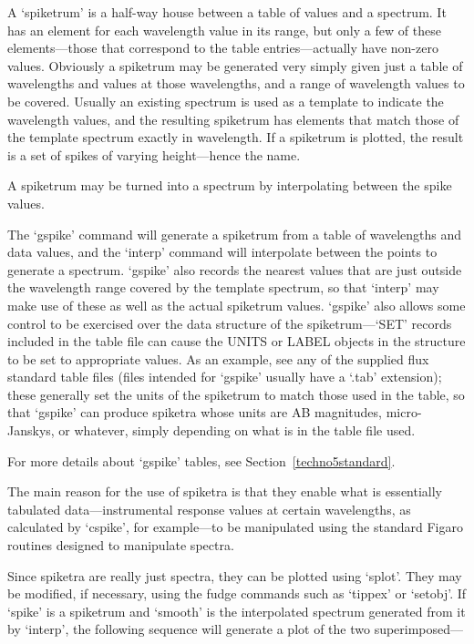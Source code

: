 \documentclass[11pt,twoside]{article}
\newcommand{\htmlref}[2]{#1}
\newcommand{\latorhtm}[2]{#1}
\newcommand{\latorhtm}[2]{#2}
\begin{document}
   A `spiketrum' is a half-way house between a table of values and a
   spectrum.  It has an element for each wavelength value in its range,
   but only a few of these elements\latorhtm{---}{-}those that correspond to
   the table entries\latorhtm{---}{-}actually have non-zero values.
   Obviously a spiketrum may
   be generated very simply given just a table of wavelengths and values
   at those wavelengths, and a range of wavelength values to be covered.
   Usually an existing spectrum is used as a template to indicate the
   wavelength values, and the resulting spiketrum has elements that
   match those of the template spectrum exactly in wavelength.  If a
   spiketrum is plotted, the result is a set of spikes of varying
   height\latorhtm{---}{-}hence the name.

   A spiketrum may be turned into a spectrum by interpolating between
   the spike values.

   The `gspike' command will generate a spiketrum from a table of
   wavelengths and data values, and the `interp' command will
   interpolate between the points to generate a spectrum.  `gspike' also
   records the nearest values that are just outside the wavelength range
   covered by the template spectrum, so that `interp' may make use of
   these as well as the actual spiketrum values. `gspike' also allows
   some control to be exercised over the data structure of the
   spiketrum\latorhtm{---}{-}`SET' records included in the table file
   can cause the UNITS or
   LABEL objects in the structure to be set to appropriate values. As an
   example, see any of the supplied flux standard table files (files
   intended for `gspike' usually have a `.tab' extension); these
   generally set the units of the spiketrum to match those used in the
   table, so that `gspike' can produce spiketra whose units are AB
   magnitudes, micro-Janskys, or whatever, simply depending on what is
   in the table file used.

   For more details about `gspike' tables, see
   \latorhtm{Section~\ref{techno5standard}.}
   {the section on \htmlref{standard files in fluxing.}{techno5standard}}

   The main reason for the use of spiketra is that they enable what is
   essentially tabulated data\latorhtm{---}{-}instrumental response values at
   certain wavelengths, as calculated by `cspike', for
   example\latorhtm{---}{-}to be
   manipulated using the standard Figaro routines designed to manipulate
   spectra.

   Since spiketra are really just spectra, they can be plotted using
   `splot'.  They may be modified, if necessary, using the fudge
   commands such as `tippex' or `setobj'.  If `spike' is a spiketrum and
   `smooth' is the interpolated spectrum generated from it by `interp',
   the following sequence will generate a plot of the two
   superimposed\latorhtm{---}{-}
\end{document}
